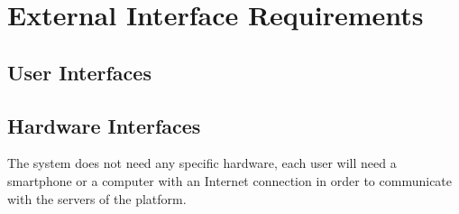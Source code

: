 \section{External Interface Requirements}

\subsection{User Interfaces}

\subsection{Hardware Interfaces}
The system does not need any specific hardware, each user will need a smartphone
or a computer with an Internet connection in order to communicate with the servers
of the platform.


